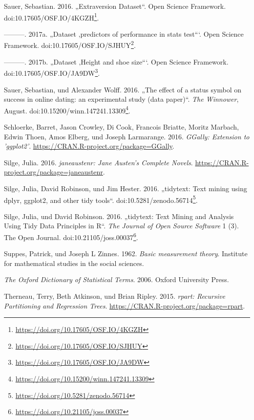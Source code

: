 \documentclass[12pt,ngerman,]{book}
\let\rmarkdownfootnote\footnote%
\def\footnote{\protect\rmarkdownfootnote}
\renewcommand{\href}[2]{#2\footnote{\url{#1}}}
\begin{document}
\hypertarget{ref-Sauer_2016}{}
Sauer, Sebastian. 2016. „Extraversion Dataset``. Open Science Framework.
doi:\href{https://doi.org/10.17605/OSF.IO/4KGZH}{10.17605/OSF.IO/4KGZH}.

\hypertarget{ref-Sauer_2017}{}
---------. 2017a. „Dataset ‚predictors of performance in stats test```.
Open Science Framework.
doi:\href{https://doi.org/10.17605/OSF.IO/SJHUY}{10.17605/OSF.IO/SJHUY}.

\hypertarget{ref-Sauer_2017a}{}
---------. 2017b. „Dataset ‚Height and shoe size```. Open Science
Framework.
doi:\href{https://doi.org/10.17605/OSF.IO/JA9DW}{10.17605/OSF.IO/JA9DW}.

\hypertarget{ref-sauer_wolff}{}
Sauer, Sebastian, und Alexander Wolff. 2016. „The effect of a status
symbol on success in online dating: an experimental study (data
paper)``. \emph{The Winnower}, August.
doi:\href{https://doi.org/10.15200/winn.147241.13309}{10.15200/winn.147241.13309}.

\hypertarget{ref-R-GGally}{}
Schloerke, Barret, Jason Crowley, Di Cook, Francois Briatte, Moritz
Marbach, Edwin Thoen, Amos Elberg, und Joseph Larmarange. 2016.
\emph{GGally: Extension to 'ggplot2'}.
\url{https://CRAN.R-project.org/package=GGally}.

\hypertarget{ref-R-janeaustenr}{}
Silge, Julia. 2016. \emph{janeaustenr: Jane Austen's Complete Novels}.
\url{https://CRAN.R-project.org/package=janeaustenr}.

\hypertarget{ref-tidytext-archive}{}
Silge, Julia, David Robinson, und Jim Hester. 2016. „tidytext: Text
mining using dplyr, ggplot2, and other tidy tools``.
doi:\href{https://doi.org/10.5281/zenodo.56714}{10.5281/zenodo.56714}.

\hypertarget{ref-Silge2016}{}
Silge, Julia, und David Robinson. 2016. „tidytext: Text Mining and
Analysis Using Tidy Data Principles in R``. \emph{The Journal of Open
Source Software} 1 (3). The Open Journal.
doi:\href{https://doi.org/10.21105/joss.00037}{10.21105/joss.00037}.

\hypertarget{ref-suppes1962basic}{}
Suppes, Patrick, und Joseph L Zinnes. 1962. \emph{Basic measurement
theory}. Institute for mathematical studies in the social sciences.

\hypertarget{ref-oxford}{}
\emph{The Oxford Dictionary of Statistical Terms}. 2006. Oxford
University Press.

\hypertarget{ref-R-rpart}{}
Therneau, Terry, Beth Atkinson, und Brian Ripley. 2015. \emph{rpart:
Recursive Partitioning and Regression Trees}.
\url{https://CRAN.R-project.org/package=rpart}.
\end{document}
